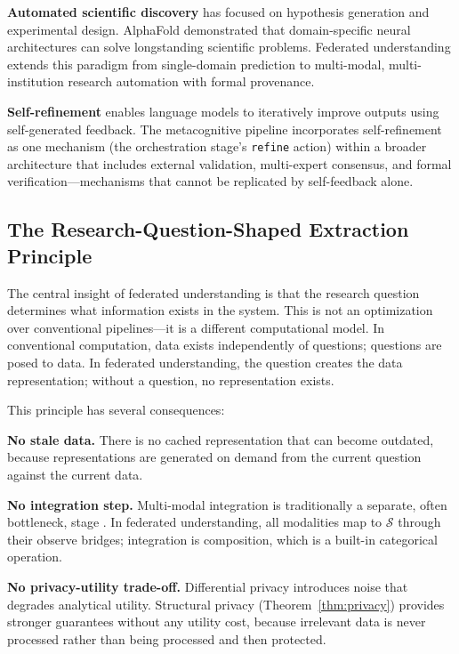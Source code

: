 \documentclass[10pt,twocolumn]{article}
\theoremstyle{definition}
\theoremstyle{remark}
\newcommand{\Sspace}{\mathcal{S}}
\begin{document}
\textbf{Automated scientific discovery} \cite{king2004,kitano2021,wang2023scientific} has focused on hypothesis generation and experimental design. AlphaFold \cite{jumper2021} demonstrated that domain-specific neural architectures can solve longstanding scientific problems. Federated understanding extends this paradigm from single-domain prediction to multi-modal, multi-institution research automation with formal provenance.

\textbf{Self-refinement} \cite{shinn2023reflexion,madaan2023self} enables language models to iteratively improve outputs using self-generated feedback. The metacognitive pipeline incorporates self-refinement as one mechanism (the orchestration stage's \texttt{refine} action) within a broader architecture that includes external validation, multi-expert consensus, and formal verification---mechanisms that cannot be replicated by self-feedback alone.

\subsection{The Research-Question-Shaped Extraction Principle}

The central insight of federated understanding is that the research question determines what information exists in the system. This is not an optimization over conventional pipelines---it is a different computational model. In conventional computation, data exists independently of questions; questions are posed to data. In federated understanding, the question creates the data representation; without a question, no representation exists.

This principle has several consequences:

\textbf{No stale data.} There is no cached representation that can become outdated, because representations are generated on demand from the current question against the current data.

\textbf{No integration step.} Multi-modal integration is traditionally a separate, often bottleneck, stage \cite{picard2021,subramanian2020}. In federated understanding, all modalities map to $\Sspace$ through their observe bridges; integration is composition, which is a built-in categorical operation.

\textbf{No privacy-utility trade-off.} Differential privacy \cite{dwork2006} introduces noise that degrades analytical utility. Structural privacy (Theorem~\ref{thm:privacy}) provides stronger guarantees without any utility cost, because irrelevant data is never processed rather than being processed and then protected.
\end{document}
